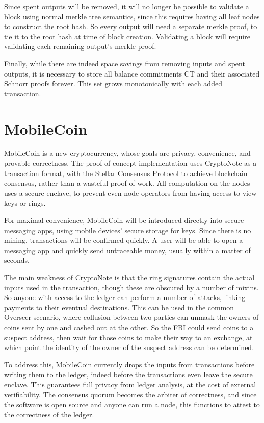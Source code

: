 \documentclass{article}
\begin{document}
Since spent outputs will be removed, it will no longer be possible to validate a block using normal merkle tree semantics, since this requires having all leaf nodes to construct the root hash.  So every output will need a separate merkle proof, to tie it to the root hash at time of block creation.  Validating a block will require validating each remaining output’s merkle proof.

Finally, while there are indeed space savings from removing inputs and spent outputs, it is necessary to store all balance commitments CT and their associated Schnorr proofs forever.  This set grows monotonically with each added transaction.  



\section{MobileCoin}

MobileCoin is a new cryptocurrency, whose goals are privacy, convenience, and provable correctness.  The proof of concept implementation uses CryptoNote as a transaction format, with the Stellar Consensus Protocol to achieve blockchain consensus, rather than a wasteful proof of work.  All computation on the nodes uses a secure enclave, to prevent even node operators from having access to view keys or rings.  

For maximal convenience, MobileCoin will be introduced directly into secure messaging apps, using mobile devices’ secure storage for keys.  Since there is no mining, transactions will be confirmed quickly.  A user will be able to open a messaging app and quickly send untraceable money, usually within a matter of seconds.

The main weakness of CryptoNote is that the ring signatures contain the actual inputs used in the transaction, though these are obscured by a number of mixins.  So anyone with access to the ledger can perform a number of attacks, linking payments to their eventual destinations.  This can be used in the common Overseer scenario, where collusion between two parties can unmask the owners of coins sent by one and cashed out at the other.  So the FBI could send coins to a suspect address, then wait for those coins to make their way to an exchange, at which point the identity of the owner of the suspect address can be determined.

To address this, MobileCoin currently drops the inputs from transactions before writing them to the ledger, indeed before the transactions even leave the secure enclave.  This guarantees full privacy from ledger analysis, at the cost of external verifiability.  The consensus quorum becomes the arbiter of correctness, and since the software is open source and anyone can run a node, this functions to attest to the correctness of the ledger.
\end{document}
